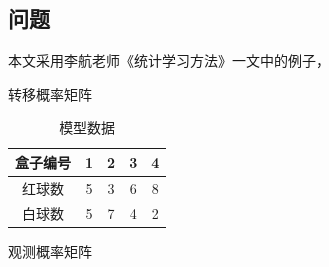 \documentclass[a4paper,12pt]{ctexart}     %
\begin{document}
	\subsection{问题}
	本文采用李航老师《统计学习方法》一文中的例子，
	
	转移概率矩阵
	
	\begin{table}[htbp]\songti{} 
		\begin{center}
			\renewcommand\arraystretch{2}         %
			\caption{模型数据 \label{tab:hezi}} 
			{  %
		
				\begin{tabular}{|c|c|c|c|c|}\hline   %
					
					\small 盒子编号&1&2&3&4\\\hline   %
					红球数&5&3&6&8\\\hline
					白球数&5&7&4&2\\\hline
				\end{tabular}
			}
		\end{center}
	\end{table}
	
	
	
	观测概率矩阵
	
\end{document}
